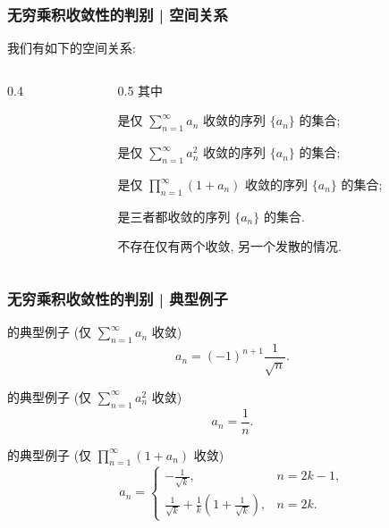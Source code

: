 \begin{frame}
\frametitle{无穷乘积收敛性的判别 | 空间关系}

我们有如下的空间关系:
\begin{columns}
\begin{column}{0.4\textwidth}
\begin{center}
\end{center}
\end{column}
\begin{column}{0.5\textwidth}
其中

 是仅 $\sum_{n=1}^\infty a_n$ 收敛的序列 $\{a_n\}$ 的集合;

 是仅 $\sum_{n=1}^\infty a_n^2$ 收敛的序列 $\{a_n\}$ 的集合;

 是仅 $\prod_{n=1}^\infty (1 + a_n)$ 收敛的序列 $\{a_n\}$ 的集合;

 是三者都收敛的序列 $\{a_n\}$ 的集合.

\begin{attnblock}
不存在仅有两个收敛, 另一个发散的情况.
\end{attnblock}
\end{column}
\end{columns}

\end{frame}


\begin{frame}
\frametitle{无穷乘积收敛性的判别 | 典型例子}

 的典型例子 (仅 $\sum_{n=1}^\infty a_n$ 收敛)
\[
a_n = (-1)^{n+1} \frac{1}{\sqrt{n}}.
\]

\pause

 的典型例子 (仅 $\sum_{n=1}^\infty a_n^2$ 收敛)
\[
a_n = \frac{1}{n}.
\]

\pause

 的典型例子 (仅 $\prod_{n=1}^\infty (1 + a_n)$ 收敛)
\[a_n = \begin{cases}
-\frac{1}{\sqrt{k}}, & n = 2k-1, \\
\frac{1}{\sqrt{k}} + \frac{1}{k} \left( 1 + \frac{1}{\sqrt{k}} \right), & n = 2k.
\end{cases}
\]

\end{frame}



